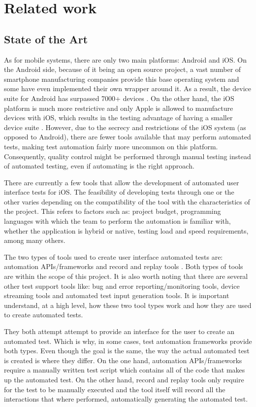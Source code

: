 \chapter{Related work}
\label{chapter2}

\section{State of the Art}

As for mobile systems, there are only two main platforms: Android and iOS. On the Android side, because of it being an open source project, a vast number of smartphone manufacturing companies provide this base operating system and some have even implemented their own wrapper around it. As a result, the device suite for Android has surpassed 7000+ devices \cite{Android Devices}. On the other hand, the iOS platform is much more restrictive and only Apple is allowed to manufacture devices with iOS, which results in the testing advantage of having a smaller device suite \cite{Apple Devices}. However, due to the secrecy and restrictions of the iOS system (as opposed to Android), there are fewer tools available that may perform automated tests, making test automation fairly more uncommon on this platform. Consequently, quality control might be performed through manual testing instead of automated testing, even if automating is the right approach.

There are currently a few tools that allow the development of automated user interface tests for iOS. The feasibility of developing tests through one or the other varies depending on the compatibility of the tool with the characteristics of the project. This refers to factors such as: project budget, programming languages with which the team to perform the automation is familiar with, whether the application is hybrid or native, testing load and speed requirements, among many others.

The two types of tools used to create user interface automated tests are: automation APIs/frameworks and record and replay tools \cite{Linares-Vasquez2017ContinuousTesting}. Both types of tools are within the scope of this project. It is also worth noting that there are several other test support tools like: bug and error reporting/monitoring tools, device streaming tools and automated test input generation tools. It is important understand, at a high level, how these two tool types work and how they are used to create automated tests.

They both attempt attempt to provide an interface for the user to create an automated test. Which is why, in some cases, test automation frameworks provide both types. Even though the goal is the same, the way the actual automated test is created is where they differ. On the one hand, automation APIs/frameworks require a manually written test script which contains all of the code that makes up the automated test. On the other hand, record and replay tools only require for the test to be manually executed and the tool itself will record all the interactions that where performed, automatically generating the automated test.

